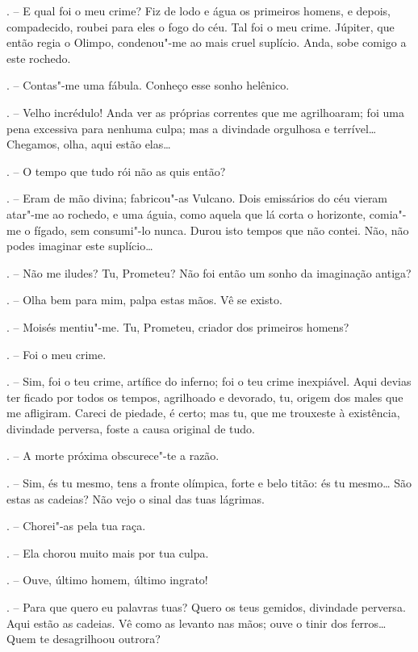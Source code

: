 \begin{Parskip}
. -- E qual foi o meu crime? Fiz de lodo e água os primeiros
homens, e depois, compadecido, roubei para eles o fogo do céu. Tal foi o
meu crime. Júpiter, que então regia o Olimpo, condenou"-me ao mais cruel
suplício. Anda, sobe comigo a este rochedo.

. -- Contas"-me uma fábula. Conheço esse sonho helênico.

. -- Velho incrédulo! Anda ver as próprias correntes que me
agrilhoaram; foi uma pena excessiva para nenhuma culpa; mas a divindade
orgulhosa e terrível\ldots{} Chegamos, olha, aqui estão elas\ldots{}

. -- O tempo que tudo rói não as quis então?

. -- Eram de mão divina; fabricou"-as Vulcano. Dois emissários do
céu vieram atar"-me ao rochedo, e uma águia, como aquela que lá corta o
horizonte, comia"-me o fígado, sem consumi"-lo nunca. Durou isto tempos
que não contei. Não, não podes imaginar este suplício\ldots{}

. -- Não me iludes? Tu, Prometeu? Não foi então um sonho da
imaginação antiga?

. -- Olha bem para mim, palpa estas mãos. Vê se existo.

. -- Moisés mentiu"-me. Tu, Prometeu, criador dos primeiros
homens?

. -- Foi o meu crime.

. -- Sim, foi o teu crime, artífice do inferno; foi o teu crime
inexpiável. Aqui devias ter ficado por todos os tempos, agrilhoado e
devorado, tu, origem dos males que me afligiram. Careci de piedade, é
certo; mas tu, que me trouxeste à existência, divindade perversa, foste
a causa original de tudo.

. -- A morte próxima obscurece"-te a razão.

. -- Sim, és tu mesmo, tens a fronte olímpica, forte e belo
titão: és tu mesmo\ldots{} São estas as cadeias? Não vejo o sinal das tuas
lágrimas.

. -- Chorei"-as pela tua raça.

. -- Ela chorou muito mais por tua culpa.

. -- Ouve, último homem, último ingrato!

. -- Para que quero eu palavras tuas? Quero os teus gemidos,
divindade perversa. Aqui estão as cadeias. Vê como as levanto nas mãos;
ouve o tinir dos ferros\ldots{} Quem te desagrilhoou outrora?


\end{Parskip}
